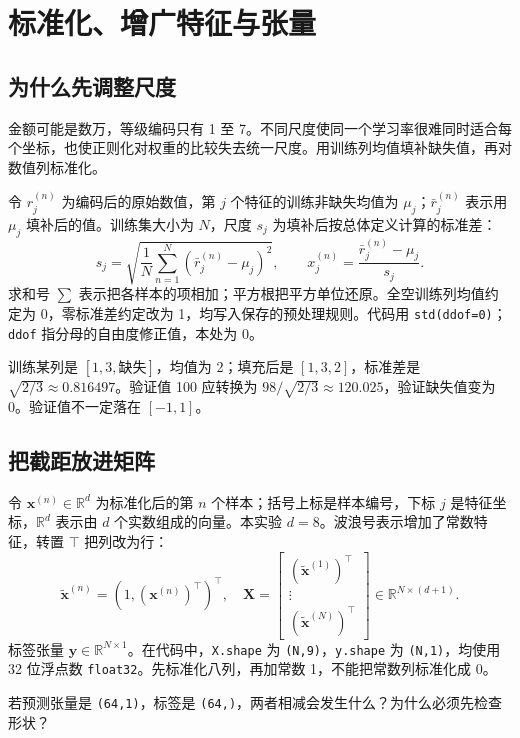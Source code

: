 \documentclass[UTF8,a4paper,11pt,fontset=fandol]{ctexart}
\begin{document}
\section{标准化、增广特征与张量}
\subsection{为什么先调整尺度}
金额可能是数万，等级编码只有 1 至 7。不同尺度使同一个学习率很难同时适合每个坐标，也使正则化对权重的比较失去统一尺度。用训练列均值填补缺失值，再对数值列标准化。

令 $r_j^{(n)}$ 为编码后的原始数值，第 $j$ 个特征的训练非缺失均值为 $\mu_j$；$\bar r_j^{(n)}$ 表示用 $\mu_j$ 填补后的值。训练集大小为 $N$，尺度 $s_j$ 为填补后按总体定义计算的标准差：
\begin{equation}
s_j=\sqrt{\frac1N\sum_{n=1}^N(\bar r_j^{(n)}-\mu_j)^2},\qquad
x_j^{(n)}=\frac{\bar r_j^{(n)}-\mu_j}{s_j}.
\end{equation}
求和号 $\sum$ 表示把各样本的项相加；平方根把平方单位还原。全空训练列均值约定为 0，零标准差约定改为 1，均写入保存的预处理规则。代码用 \texttt{std(ddof=0)}；\texttt{ddof} 指分母的自由度修正值，本处为 0。
\begin{examplebox}[用三个数检查 C2]
训练某列是 $[1,3,\text{缺失}]$，均值为 2；填充后是 $[1,3,2]$，标准差是 $\sqrt{2/3}\approx0.816497$。验证值 100 应转换为 $98/\sqrt{2/3}\approx120.025$，验证缺失值变为 0。验证值不一定落在 $[-1,1]$。
\end{examplebox}
\subsection{把截距放进矩阵}
令 $\mathbf x^{(n)}\in\mathbb R^d$ 为标准化后的第 $n$ 个样本；括号上标是样本编号，下标 $j$ 是特征坐标，$\mathbb R^d$ 表示由 $d$ 个实数组成的向量。本实验 $d=8$。波浪号表示增加了常数特征，转置 $\top$ 把列改为行：
\begin{equation}
\tilde{\mathbf x}^{(n)}=(1,(\mathbf x^{(n)})^\top)^\top,\quad
\mathbf X=\begin{bmatrix}(\tilde{\mathbf x}^{(1)})^\top\\ \vdots\\(\tilde{\mathbf x}^{(N)})^\top\end{bmatrix}\in\mathbb R^{N\times(d+1)}.
\end{equation}
标签张量 $\mathbf y\in\mathbb R^{N\times1}$。在代码中，\texttt{X.shape} 为 \texttt{(N,9)}，\texttt{y.shape} 为 \texttt{(N,1)}，均使用 32 位浮点数 \texttt{float32}。先标准化八列，再加常数 1，不能把常数列标准化成 0。
\begin{questionbox}[检查点 C2]
若预测张量是 \texttt{(64,1)}，标签是 \texttt{(64,)}，两者相减会发生什么？为什么必须先检查形状？
\end{questionbox}
\clearpage
\end{document}
